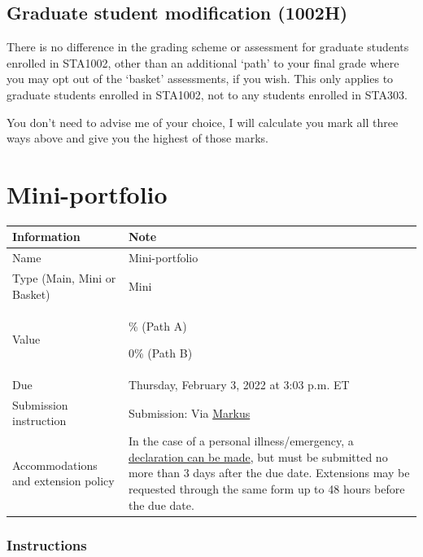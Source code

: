 \documentclass[
  openany]{book}
\begin{document}
\hypertarget{graduate-student-modification-1002h}{%
\section{Graduate student modification (1002H)}\label{graduate-student-modification-1002h}}

There is no difference in the grading scheme or assessment for graduate students enrolled in STA1002, other than an additional `path' to your final grade where you may opt out of the `basket' assessments, if you wish. This only applies to graduate students enrolled in STA1002, not to any students enrolled in STA303.

You don't need to advise me of your choice, I will calculate you mark all three ways above and give you the highest of those marks.

\hypertarget{mini-portfolio}{%
\chapter{Mini-portfolio}\label{mini-portfolio}}

\begin{longtable}[]{@{}
  >{\raggedright\arraybackslash}p{}
  >{\raggedright\arraybackslash}p{}@{}}
\toprule
\textbf{Information} & \textbf{Note} \\
\midrule
\endhead
Name & Mini-portfolio \\
Type (Main, Mini or Basket) & Mini \\
Value & 5\% (Path A)

0\% (Path B) \\
Due & Thursday, February 3, 2022 at 3:03 p.m. ET \\
Submission instruction & Submission: Via \href{https://markus-ds.teach.cs.toronto.edu/}{Markus} \\
Accommodations and extension policy & In the case of a personal illness/emergency, a \href{https://forms.office.com/Pages/ResponsePage.aspx?id=JsKqeAMvTUuQN7RtVsVSEOKHUU3SzAJJhmOKjJhDWEpUNTFDSzhZTFlXUzVYMVlNM1FEUTRZMkVWOC4u}{declaration can be made}, but must be submitted no more than 3 days after the due date. Extensions may be requested through the same form up to 48 hours before the due date. \\
\bottomrule
\end{longtable}

\hypertarget{instructions}{%
\subsection{Instructions}\label{instructions}}
\end{document}
